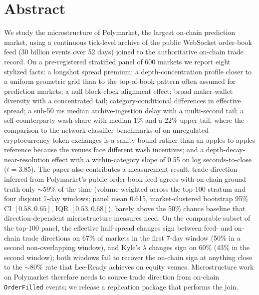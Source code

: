 \section*{Abstract}
We study the microstructure of Polymarket, the largest on-chain
prediction market, using a continuous tick-level archive of the
public WebSocket order-book feed (30 billion events over 52 days)
joined to the authoritative on-chain trade record. On a pre-registered
stratified panel of 600 markets we report eight stylized facts: a
longshot spread premium; a depth-concentration profile closer to a
uniform geometric grid than to the top-of-book pattern often assumed
for prediction markets; a null block-clock alignment effect; broad
maker-wallet diversity with a concentrated tail; category-conditional
differences in effective spread; a sub-50 ms median archive-ingestion
delay with a multi-second tail; a self-counterparty wash share with
median 1\% and a 22\% upper tail, where the comparison to the
network-classifier benchmarks of \citet{cong-li-tang-yang-2023} on
unregulated cryptocurrency token exchanges is a sanity bound rather
than an apples-to-apples reference because the venues face different
wash incentives; and a
depth-decay-near-resolution effect with a within-category slope of
0.55 on log seconds-to-close ($t=3.85$). The paper also contributes a
measurement result: trade direction inferred from Polymarket's public
order-book feed agrees with on-chain ground truth only $\sim 59\%$
of the time (volume-weighted across the top-100 stratum and four
disjoint 7-day windows; panel mean 0.615, market-clustered bootstrap
95\% CI $[0.58, 0.65]$, IQR $[0.53, 0.68]$),
barely above the 50\% chance baseline that direction-dependent
microstructure measures need. On the comparable subset of the
top-100 panel, the effective half-spread changes sign between feed-
and on-chain trade directions on 67\% of markets in the first 7-day
window (50\% in a second non-overlapping window), and Kyle's
$\lambda$ changes sign on 60\% (43\% in the second window); both
windows fail to recover the on-chain sign at anything close to the
$\sim 80\%$ rate that Lee-Ready achieves on equity venues.
Microstructure work on Polymarket therefore
needs to source trade direction from on-chain \texttt{OrderFilled}
events; we release a replication package that performs the join.
